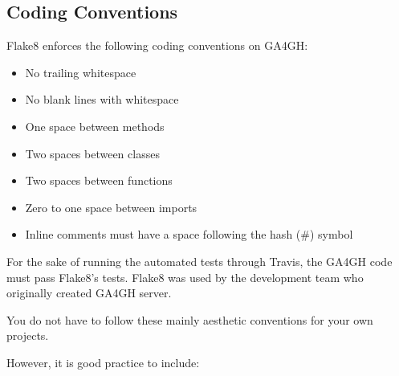 \documentclass{article}
\begin{document}
\subsection{Coding Conventions}

Flake8 enforces the following coding conventions on GA4GH:

\begin{itemize}
\item No trailing whitespace
\item No blank lines with whitespace
\item One space between methods
\item Two spaces between classes
\item Two spaces between functions
\item Zero to one space between imports
\item Inline comments must have a space following the hash (\#) symbol
\end{itemize}

For the sake of running the automated tests through Travis,
the GA4GH code must pass Flake8's tests.
Flake8 was used by the development team who originally created GA4GH server.

You do not have to follow these mainly aesthetic conventions for your 
own projects.

However, it is good practice to include:
\end{document}
